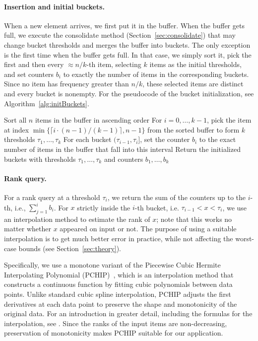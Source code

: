 \documentclass[acmsmall]{acmart}
\theoremstyle{remark}
\begin{document}
\paragraph{Insertion and initial buckets.} When a new element arrives, we first put it in the buffer. 
When the buffer gets full, we execute the consolidate method (Section~\ref{sec:consolidate})
that may change bucket thresholds and merges the buffer into buckets. 
The only exception is the first time when the buffer gets full.
In that case, we simply sort it, pick the first and then every $\approx n / k$-th item, selecting $k$ items as the initial thresholds, and set counters $b_i$ to exactly the number of items in the corresponding buckets. 
Since no item has frequency greater than $n/k$, these selected items are distinct and every bucket is nonempty.
For the pseudocode of the bucket initialization, see Algorithm~\ref{alg:initBuckets}.

\begin{algorithm}[t] 
	\caption{Buckets Initialization}
	\label{alg:initBuckets}
	Sort all $n$ items in the buffer in ascending order\;
	For $i = 0, \dots, k -1$, pick the item at index $\min\{\lceil i\cdot (n-1) / (k-1) \rceil, n-1\}$ from the sorted buffer to form $k$ thresholds $\tau_1, \dots, \tau_k$\;
	For each bucket $(\tau_{i-1}, \tau_i]$, set the counter $b_i$ to the exact number of items in the buffer that fall into this interval\;
	Return the initialized buckets with thresholds $\tau_1, \dots, \tau_k$ and counters $b_1, \dots, b_k$\;
\end{algorithm}

\paragraph{Rank query.}
For a rank query at a threshold $\tau_i$, we return the sum of the counters up to the $i$-th, i.e., $\sum_{j=1}^i b_i$.
For $x$ strictly inside the $i$-th bucket, i.e. $\tau_{i-1} < x < \tau_i$, we use an interpolation method to estimate the rank of $x$; note that this works no matter whether $x$ appeared on input or not.
The purpose of using a suitable interpolation is to get much better error in practice,
while not affecting the worst-case bounds (see Section~\ref{sec:theory}).

Specifically, we use a monotone variant of the Piecewise Cubic Hermite Interpolating Polynomial (PCHIP)~\cite{fritsch.butland:1984:siamj.sci.andstat.comput., fritsch1980monotone}, which is an interpolation method that constructs a continuous function by fitting cubic polynomials between data points. 
Unlike standard cubic spline interpolation, PCHIP adjusts the first derivatives at each data point to preserve the shape and monotonicity of the original data.
For an introduction in greater detail, including the formulas for the interpolation, see \cite{Wong2020splines}.
Since the ranks of the input items are non-decreasing, preservation of monotonicity makes PCHIP suitable for our application.
\end{document}

